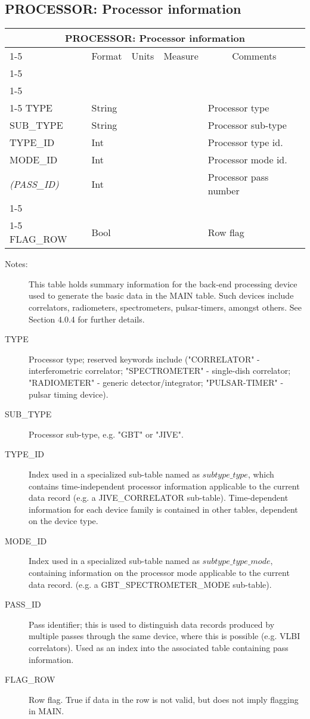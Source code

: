 \documentclass{article}
\newcommand{\defline}[1]{\cline{1-5}
\multicolumn{5}{|l|}{#1} \\
\cline{1-5}}
\newcommand{\definetable}[2]
{
	\vfill\newpage
	\subsection{#1}
        \vspace{0.15in}
        \small
	\begin{tabular}{|l|p{1.25in}|l|p{.9in}|p{1.4in}|}
	\hline
	\multicolumn{5}{|c|}{\bf #1}\\ 
	\cline{1-5}
        \multicolumn{1}{|c|}{Name}&\multicolumn{1}{|c|}{Format}&
        \multicolumn{1}{|c|}{Units}&\multicolumn{1}{|c|}{Measure}&
        \multicolumn{1}{|c|}{Comments}\\
        \cline{1-5}
        #2
        \hline
	\end{tabular}
}
\begin{document}
\definetable{PROCESSOR: Processor information}{
\defline{\bf Columns}
\defline{\em Data}
TYPE            & String & & & Processor type \\
SUB\_TYPE & String & & & Processor sub-type\\
TYPE\_ID  & Int & & & Processor type id.\\
MODE\_ID  & Int & & & Processor mode id.\\
{\it (PASS\_ID)}  & Int & & & Processor pass number\\
\defline{\em Flags}
FLAG\_ROW & Bool & & & Row flag\\
}
\begin{description}

\item[Notes:] This table holds summary information for the back-end
processing device used to generate the basic data in the MAIN
table. Such devices include correlators, radiometers, spectrometers,
pulsar-timers, amongst others. See Section 4.0.4 for further details.

\item[TYPE] Processor type; reserved keywords include ("CORRELATOR" -
interferometric correlator; "SPECTROMETER" - single-dish correlator;
"RADIOMETER" - generic detector/integrator; "PULSAR-TIMER" - pulsar
timing device).

\item[SUB\_TYPE] Processor sub-type, e.g. "GBT" or "JIVE".

\item[TYPE\_ID] Index used in a specialized sub-table named as
$subtype\_type$, which contains time-independent processor information
applicable to the current data record (e.g. a JIVE\_CORRELATOR
sub-table).  Time-dependent information for each device family is
contained in other tables, dependent on the device type.

\item[MODE\_ID] Index used in a specialized sub-table named as
$subtype\_type\_mode$, containing information on the processor mode
applicable to the current data record. (e.g. a GBT\_SPECTROMETER\_MODE
sub-table).

\item[PASS\_ID] Pass identifier; this is used to distinguish data records
produced by multiple passes through the same device, where this is
possible (e.g. VLBI correlators). Used as an index into the associated
table containing pass information.

\item[FLAG\_ROW] Row flag. True if data in the row is not valid, but
does not imply flagging in MAIN.

\end{description}
\end{document}
